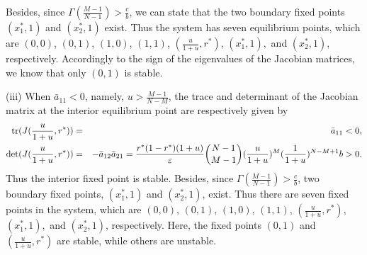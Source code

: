 \documentclass[9pt]{elife}
\begin{document}
\begin{appendixbox}
Besides, since $\Gamma(\frac{M-1}{N-1})>\frac{c}{b}$, we can state that the two boundary fixed points $(x_{1}^{*}, 1)$ and $(x_{2}^{*}, 1)$ exist. Thus the system has seven equilibrium points, which are $(0, 0)$, $(0, 1)$, $(1, 0)$, $(1, 1)$, $(\frac{u}{1+u}, r^{*})$, $(x_{1}^{*},1),$ and $(x_{2}^{*},1)$, respectively. Accordingly to the sign of the eigenvalues of the Jacobian matrices, we know that only $(0, 1)$ is stable.


(iii) When $\bar{a}_{11}<0$, namely, $u>\frac{M-1}{N-M}$, the trace and determinant of the Jacobian matrix at the interior equilibrium point are respectively given by
\begin{eqnarray*}
{\rm tr}(J(\frac{u}{1+u},  r^{*}))&=&\bar{a}_{11}<0,\\
{\rm det} (J(\frac{u}{1+u},  r^{*}))&=&-\bar{a}_{12}\bar{a}_{21}=\frac{r^{*}(1-r^{*})(1+u)}{\varepsilon}\binom{N-1}{M-1}(\frac{u}{1+u})^{M}(\frac{1}{1+u})^{N-M+1}b>0.
\end{eqnarray*}
Thus the interior fixed point is stable. Besides, since $\Gamma(\frac{M-1}{N-1})>\frac{c}{b}$, two boundary fixed points, $(x_{1}^{*},1)$ and $(x_{2}^{*},1)$, exist. Thus there are seven fixed points in the system, which are $(0, 0)$, $(0, 1)$, $(1, 0)$, $(1, 1)$, $(\frac{u}{1+u}, r^{*})$, $(x_{1}^{*},1),$ and $(x_{2}^{*},1)$, respectively. Here, the fixed points $(0, 1)$ and $(\frac{u}{1+u}, r^{*})$ are stable, while others are unstable.


\end{appendixbox}
\end{document}
